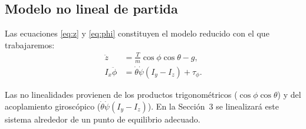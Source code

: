 \documentclass{uofa-eng-assignment}
\begin{document}
\subsection{Modelo no lineal de partida}

Las ecuaciones \eqref{eq:z} y \eqref{eq:phi} constituyen el modelo reducido con el que trabajaremos:
\[
\begin{aligned}
\ddot{z}      &= \frac{T}{m}\cos\phi\cos\theta - g,\\
I_x\ddot{\phi}&= \dot{\theta}\dot{\psi}(I_y - I_z) + \tau_\phi.
\end{aligned}
\]

Las no linealidades provienen de los productos trigonométricos ($\cos\phi\cos\theta$) y del acoplamiento giroscópico ($\dot{\theta}\dot{\psi}(I_y-I_z)$). En la Sección~3 se linealizará este sistema alrededor de un punto de equilibrio adecuado.
\end{document}
